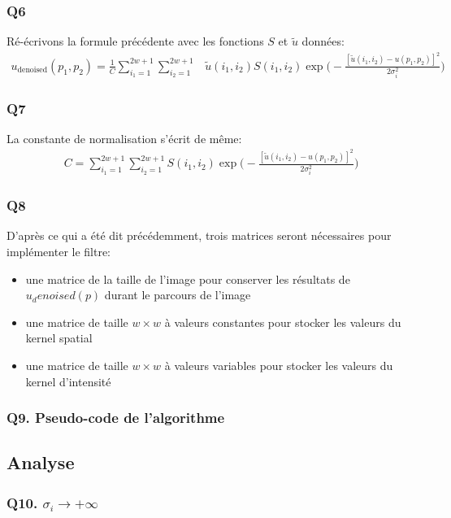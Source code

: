 \documentclass{article}
\begin{document}
\subsubsection*{Q6}
Ré-écrivons la formule précédente avec les fonctions $S$ et $\tilde{u}$ données:
\begin{equation*}\begin{split}
u_\text{denoised}(p_1, p_2) = \frac{1}{C} \displaystyle\sum_{i_1 = 1}^{2w + 1}
\displaystyle\sum_{i_2 = 1}^{2w + 1} & \tilde{u}(i_1, i_2) S(i_1,i_2) \exp{ \big ( - \frac{[\tilde{u}(i_1, i_2) - u(p_1, p_2)]^2}{2\sigma_i^2} \big )}
\end{split}\end{equation*}

\subsubsection*{Q7}
La constante de normalisation s'écrit de même:
\begin{equation*}\begin{split}
C = \displaystyle\sum_{i_1 = 1}^{2w + 1}
\displaystyle\sum_{i_2 = 1}^{2w + 1} S(i_1,i_2) \exp{ \big ( - \frac{[\tilde{u}(i_1, i_2) - u(p_1, p_2)]^2}{2\sigma_i^2} \big )}
\end{split}\end{equation*}
\subsubsection*{Q8}
D'après ce qui a été dit précédemment, trois matrices seront nécessaires pour implémenter le filtre:
\begin{itemize}
\item une matrice de la taille de l'image pour conserver les résultats de $u_denoised(p)$ durant le parcours de l'image
\item une matrice de taille $w \times w$ à valeurs constantes pour stocker les valeurs du kernel spatial
\item une matrice de taille $w \times w$ à valeurs variables pour stocker les valeurs du kernel d'intensité
\end{itemize}
\subsubsection*{Q9. Pseudo-code de l'algorithme}
\subsection{Analyse}
\subsubsection*{Q10. $\sigma_i \rightarrow + \infty $}
\end{document}
